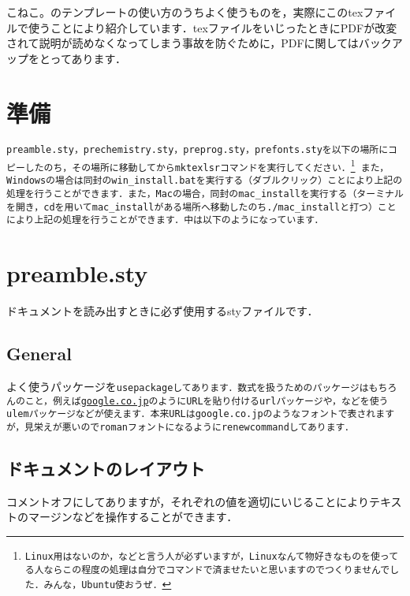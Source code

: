 \documentclass[a4paper, 9pt]{jsarticle}
\title{\sf{こねこ。のテンプレートver2.1使用方法}}
\author{\sf{こねこ。}}
\date{\sf{\today}}
\begin{document}
\maketitle
こねこ。のテンプレートの使い方のうちよく使うものを，実際にこのtexファイルで使うことにより紹介しています．texファイルをいじったときにPDFが改変されて説明が読めなくなってしまう事故を防ぐために，PDFに関してはバックアップをとってあります．\par 
\section{準備}
\tt{preamble.sty}，\tt{prechemistry.sty}，\tt{preprog.sty}，\tt{prefonts.sty}を以下の場所にコピーしたのち，その場所に移動してから\tt{mktexlsr}コマンドを実行してください．\footnote{Linux用はないのか，などと言う人が必ずいますが，Linuxなんて物好きなものを使ってる人ならこの程度の処理は自分でコマンドで済ませたいと思いますのでつくりませんでした．みんな，Ubuntu使おうぜ．}
また，Windowsの場合は同封の\tt{win\_install.bat}を実行する（ダブルクリック）ことにより上記の処理を行うことができます．また，Macの場合，同封の\tt{mac\_install}を実行する（ターミナルを開き，\tt{cd}を用いて\tt{mac\_install}がある場所へ移動したのち\tt{./mac\_install}と打つ）ことにより上記の処理を行うことができます．中は以下のようになっています．



\section{preamble.sty}
ドキュメントを読み出すときに必ず使用するstyファイルです．
\subsection{General}
よく使うパッケージを\tt{usepackage}してあります．数式を扱うためのパッケージはもちろんのこと，例えば\url{google.co.jp}のようにURLを貼り付ける\tt{url}パッケージや，などを使う\tt{ulem}パッケージなどが使えます．本来URLは\tt{google.co.jp}のようなフォントで表されますが，見栄えが悪いのでromanフォントになるように\tt{renewcommand}してあります．
\subsection{ドキュメントのレイアウト}
コメントオフにしてありますが，それぞれの値を適切にいじることによりテキストのマージンなどを操作することができます．
\end{document}
